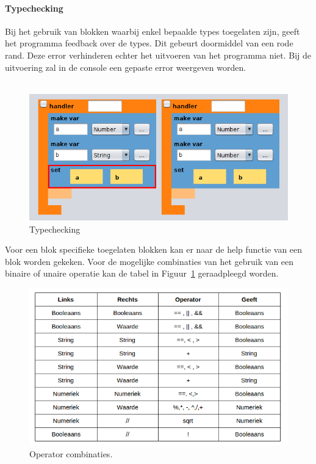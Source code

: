 \documentclass[]{article}
\begin{document}
\paragraph{Typechecking}
Bij het gebruik van blokken waarbij enkel bepaalde types toegelaten zijn, geeft het programma feedback over de types. 
Dit gebeurt doormiddel van een rode rand. Deze error verhinderen echter het uitvoeren van het programma niet. Bij de uitvoering zal in de console een gepaste error weergeven worden.\\\\
\begin{figure}[H]
  \centering
\includegraphics[scale=0.5]{Documentatie/images/typecheckError}
  \caption{Typechecking} 
\end{figure}
Voor een blok specifieke toegelaten blokken kan er naar de help functie van een blok worden gekeken. Voor de mogelijke combinaties van het gebruik van een binaire of unaire operatie kan de tabel in Figuur~\ref{operatortable} geraadpleegd worden.
\begin{figure}[H]
  \centering
\includegraphics[scale=0.5]{Documentatie/images/operator}
  \caption{Operator combinaties.} 
  \label{operatortable}
\end{figure}
\end{document}
